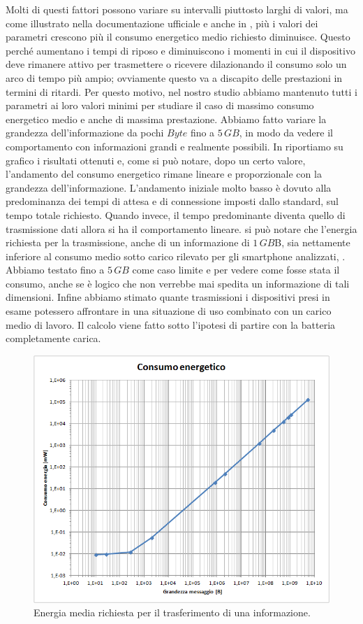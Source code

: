 Molti di questi fattori possono variare su intervalli piuttosto larghi di valori, ma come illustrato nella documentazione ufficiale \cite{BT-CoreSpec4.0} e anche in \cite{sensor2012}, più i valori dei parametri crescono più il consumo energetico medio richiesto diminuisce. Questo perché aumentano i tempi di riposo e diminuiscono i momenti in cui il dispositivo deve rimanere attivo per trasmettere o ricevere dilazionando il consumo solo un arco di tempo più ampio; ovviamente questo va a discapito delle prestazioni in termini di ritardi. Per questo motivo, nel nostro studio abbiamo mantenuto tutti i parametri ai loro valori minimi per studiare il caso di massimo consumo energetico medio e anche di massima prestazione. Abbiamo fatto variare la grandezza dell'informazione da pochi $Byte$ fino a $5\,GB$, in modo da vedere il comportamento con informazioni grandi e realmente possibili. In  riportiamo su grafico i risultati ottenuti e, come si può notare, dopo un certo valore, l'andamento del consumo energetico rimane lineare e proporzionale con la grandezza dell'informazione. L'andamento iniziale molto basso è dovuto alla predominanza dei tempi di attesa e di connessione imposti dallo standard, sul tempo totale richiesto. Quando invece, il tempo predominante diventa quello di trasmissione dati allora si ha il comportamento lineare. si può notare che l'energia richiesta per la trasmissione, anche di un informazione di $1\,GB$B, sia nettamente inferiore al consumo medio sotto carico rilevato per gli smartphone analizzati, . Abbiamo testato fino a $5\,GB$ come caso limite e per vedere come fosse stata il consumo, anche se è logico che non verrebbe mai spedita un informazione di tali dimensioni. Infine abbiamo stimato quante trasmissioni i dispositivi presi in esame potessero affrontare in una situazione di uso combinato con un carico medio di lavoro. Il calcolo viene fatto sotto l'ipotesi di partire con la batteria completamente carica.
\begin{figure}[t]
	\centering
	\includegraphics[width=0.8\linewidth]{Images/studio_energetico/cons_en_sing_tx_02}
	\caption[Studio energetico]{Energia media richiesta per il trasferimento di una informazione.}
	\label{fig:cons_en_sing_tx_02}
\end{figure}
